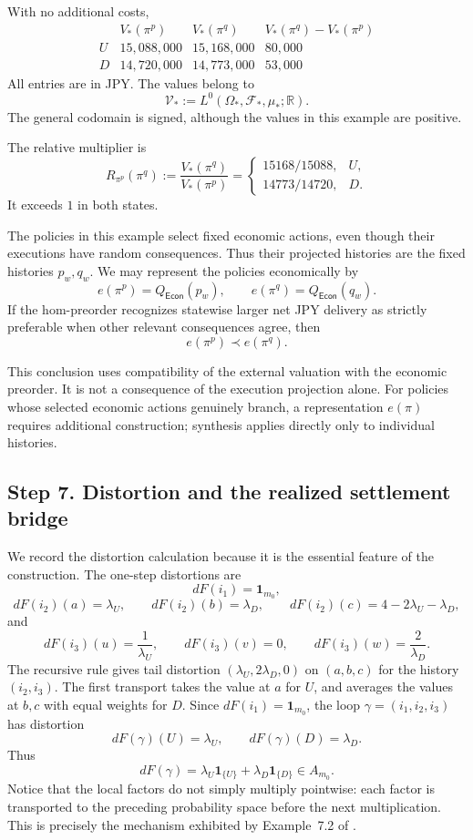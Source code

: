 \documentclass[11pt,a4paper]{article}
\newcommand{\Econ}{\mathsf{Econ}}
\begin{document}
With no additional costs,
\[
\begin{array}{c|rrr}
 &V_*(\pi^p)&V_*(\pi^q)
 &V_*(\pi^q)-V_*(\pi^p)\\ \hline
 U&15{,}088{,}000&15{,}168{,}000&80{,}000\\
 D&14{,}720{,}000&14{,}773{,}000&53{,}000
\end{array}
\]
All entries are in JPY.
The values belong to
\[
  \mathcal V_*
  :=
  L^0(\Omega_*,\mathcal F_*,\mu_*;\mathbb R).
\]
The general codomain is signed, although the values in this
example are positive.

The relative multiplier is
\[
  R_{\pi^p}(\pi^q)
  :=
  \frac{V_*(\pi^q)}{V_*(\pi^p)}
  =
  \begin{cases}
    15168/15088,&U,\\
    14773/14720,&D.
  \end{cases}
\]
It exceeds $1$ in both states.

The policies in this example select fixed economic actions,
even though their executions have random consequences.
Thus their projected histories are the fixed histories
$p_w,q_w$.
We may represent the policies economically by
\[
  e(\pi^p)=Q_{\Econ}(p_w),
  \qquad
  e(\pi^q)=Q_{\Econ}(q_w).
\]
If the hom-preorder recognizes statewise larger net JPY delivery
as strictly preferable when other relevant consequences agree,
then
\[
  e(\pi^p)\prec e(\pi^q).
\]

This conclusion uses compatibility of the external valuation
with the economic preorder.
It is not a consequence of the execution projection alone.
For policies whose selected economic actions genuinely branch,
a representation $e(\pi)$ requires additional construction;
synthesis applies directly only to individual histories.

\subsection{Step 7. Distortion and the realized settlement bridge}

We record the distortion calculation because it is the essential feature
of the construction. The one-step distortions are
\[
  dF(i_1)=\mathbf 1_{m_0},
\]
\[
  dF(i_2)(a)=\lambda_U,
  \qquad
  dF(i_2)(b)=\lambda_D,
  \qquad
  dF(i_2)(c)=4-2\lambda_U-\lambda_D,
\]
and
\[
  dF(i_3)(u)=\frac1{\lambda_U},
  \qquad
  dF(i_3)(v)=0,
  \qquad
  dF(i_3)(w)=\frac2{\lambda_D}.
\]
The recursive rule gives tail distortion
$(\lambda_U,2\lambda_D,0)$ on $(a,b,c)$ for the history $(i_2,i_3)$.
The first transport takes the value at $a$ for $U$, and averages the
values at $b,c$ with equal weights for $D$. Since $dF(i_1)=\mathbf 1_{m_0}$,
the loop $\gamma=(i_1,i_2,i_3)$ has distortion
\[
  dF(\gamma)(U)=\lambda_U,
  \qquad
  dF(\gamma)(D)=\lambda_D.
  \tag{P3}
\]
Thus
\[
  dF(\gamma)
  =
  \lambda_U\mathbf1_{\{U\}}
  +\lambda_D\mathbf1_{\{D\}}
  \in A_{m_0}.
  \tag{P4}
\]
Notice that the local factors do not simply multiply pointwise: each
factor is transported to the preceding probability space before the next
multiplication. This is precisely the mechanism exhibited by
Example~7.2 of \cite{AdachiHaraAB}.
\end{document}
